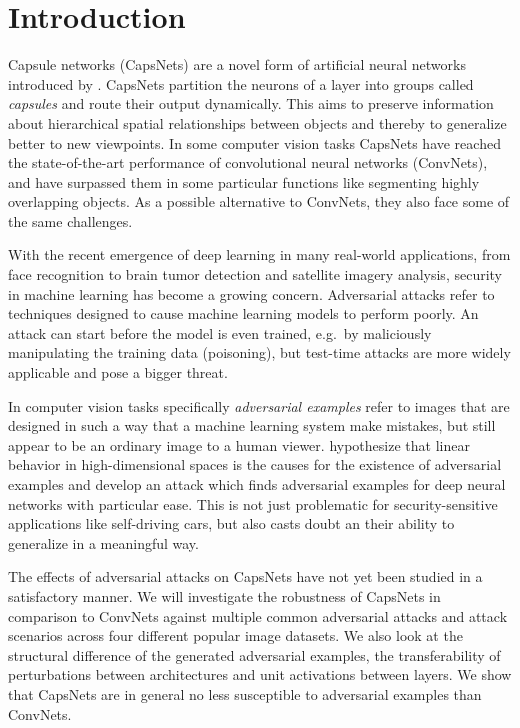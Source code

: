 \section{Introduction}
\label{sec:introduction}

Capsule networks (CapsNets) are a novel form of artificial neural networks introduced by \citet{capsules,em}.
CapsNets partition the neurons of a layer into groups called \emph{capsules} and route their output dynamically.
This aims to preserve information about hierarchical spatial relationships between objects and thereby to generalize better to new viewpoints.
In some computer vision tasks CapsNets have reached the state-of-the-art performance of convolutional neural networks (ConvNets), and have surpassed them in some particular functions like segmenting highly overlapping objects.
As a possible alternative to ConvNets, they also face some of the same challenges.

With the recent emergence of deep learning in many real-world applications, from face recognition to brain tumor detection and satellite imagery analysis, security in machine learning has become a growing concern.
Adversarial attacks refer to techniques designed to cause machine learning models to perform poorly.
An attack can start before the model is even trained, e.g.\ by maliciously manipulating the training data (poisoning), but test-time attacks are more widely applicable and pose a bigger threat.

In computer vision tasks specifically \emph{adversarial examples} \citep{intriguing} refer to images  that are designed in such a way that a machine learning system make mistakes, but still appear to be an ordinary image to a human viewer.
\citet{fgsm} hypothesize that linear behavior in high-dimensional spaces is the causes for the existence of adversarial examples and develop an attack which finds adversarial examples for deep neural networks with particular ease.
This is not just problematic for security-sensitive applications like self-driving cars, but also casts doubt an their ability to generalize in a meaningful way.

The effects of adversarial attacks on CapsNets have not yet been studied in a satisfactory manner.
We will investigate the robustness of CapsNets in comparison to ConvNets against multiple common adversarial attacks and attack scenarios across four different popular image datasets.
We also look at the structural difference of the generated adversarial examples, the transferability of perturbations between architectures and unit activations between layers.
We show that CapsNets are in general no less susceptible to adversarial examples than ConvNets.

